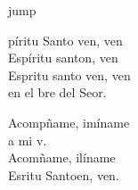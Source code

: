\begin{cancion}jump\\
	\begin{chorus}%
		píritu Santo ven, ven\\
		Espíritu santon, ven\\
		Espritu santo ven, ven\\
		en el bre del Seor.\jump\\
	\end{chorus}%
	Acompñame, imíname\\
	a mi v.\\
	Acomñame, ilíname\\
	Esritu Santoen, ven.\\
\end{cancion}%
